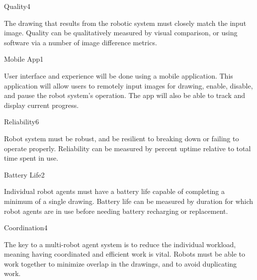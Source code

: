 \begin{nonfunctional_requirement}{Quality}{4}
\item The drawing that results from the robotic system must closely match the input image. Quality can be qualitatively measured by visual comparison, or using software via a number of image difference metrics.
\end{nonfunctional_requirement}

\begin{nonfunctional_requirement}{Mobile App}{1}
\item User interface and experience will be done using a mobile application. This application will allow users to remotely input images for drawing, enable, disable, and pause the robot system's operation. The app will also be able to track and display current progress.
\end{nonfunctional_requirement}

\begin{nonfunctional_requirement}{Reliability}{6}
\item Robot system must be robust, and be resilient to breaking down or failing to operate properly. Reliability can be measured by percent uptime relative to total time spent in use.
\end{nonfunctional_requirement}

\begin{nonfunctional_requirement}{Battery Life}{2}
\item Individual robot agents must have a battery life capable of completing a minimum of a single drawing. Battery life can be measured by duration for which robot agents are in use before needing battery recharging or replacement.
\end{nonfunctional_requirement}

\begin{nonfunctional_requirement}{Coordination}{4}
\item The key to a multi-robot agent system is to reduce the individual workload, meaning having coordinated and efficient work is vital. Robots must be able to work together to minimize overlap in the drawings, and to avoid duplicating work.
\end{nonfunctional_requirement}

